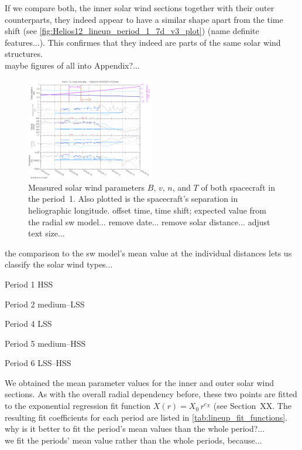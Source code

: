 If we compare both, the inner solar wind sections together with their outer counterparts, they indeed appear to have a similar shape apart from the time shift (see \autoref{fig:Helios12_lineup_period_1_7d_v3_plot}) (name definite features...). This confirmes that they indeed are parts of the same solar wind structures.\\
maybe figures of all into Appendix?...\\
\begin{figure}[htb]
	\centering
	\includegraphics[width=0.5\textwidth]{images/gnuplots/Helios12_lineup_period_1_7d_v3_plot.png}
	\caption{Measured solar wind parameters $B$, $v$, $n$, and $T$ of both spacecraft in the period~1. Also plotted is the spacecraft's separation in heliographic longitude. offset time, time shift; expected value from the radial sw model... remove date... remove solar distance... adjust text size...}
	\label{fig:Helios12_lineup_period_1_7d_v3_plot}
\end{figure}


the comparison to the sw model's mean value at the individual distances lets us classify the solar wind types...
\begin{description*}
	\item[Period 1]	HSS
	\item[Period 2]	medium--LSS
	\item[Period 4]	LSS
	\item[Period 5]	medium--HSS
	\item[Period 6]	LSS--HSS
\end{description*}


We obtained the mean parameter values for the inner and outer solar wind sections. As with the overall radial dependency before, these two points are fitted to the exponential regression fit function $X(r) = X_0\,r^{c_X}$ (see Section~XX. The resulting fit coefficients for each period are listed in \autoref{tab:lineup_fit_functions}.\\
why is it better to fit the period's mean values than the whole period?...\\
we fit the periods' mean value rather than the whole periods, because...\\

